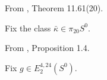 \begin{definition}
\label{frontier:Literature:051dbca71e3a}
From \cite{BR21}, Theorem 11.61(20).\par

Fix the class $\bar\kappa\in\pi_{20}S^0$.
\end{definition}



\begin{definition}
\label{frontier:Literature:174e2bfc0dfb}
From \cite{BR21}, Proposition 1.4.\par

Fix $g\in E_2^{4,24}(S^0)$.
\end{definition}

